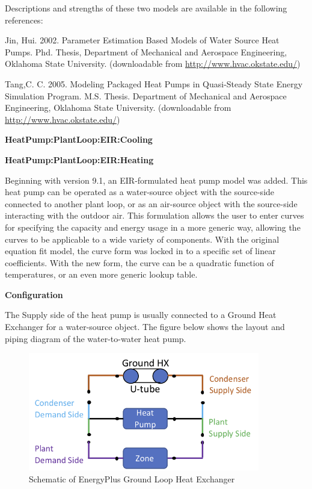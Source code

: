 Descriptions and strengths of these two models are available in the following references:

Jin, Hui. 2002. Parameter Estimation Based Models of Water Source Heat Pumps. Phd. Thesis, Department of Mechanical and Aerospace Engineering, Oklahoma State University. (downloadable from \href{http://www.hvac.okstate.edu}{http://www.hvac.okstate.edu/})

Tang,C. C. 2005. Modeling Packaged Heat Pumps in Quasi-Steady State Energy Simulation Program. M.S. Thesis. Department of Mechanical and Aerospace Engineering, Oklahoma State University. (downloadable from \href{http://www.hvac.okstate.edu}{http://www.hvac.okstate.edu/})

\textbf{HeatPump:PlantLoop:EIR:Cooling}

\textbf{HeatPump:PlantLoop:EIR:Heating}

Beginning with version 9.1, an EIR-formulated heat pump model was added. This heat pump can be operated as a water-source object with the source-side connected to another plant loop, or as an air-source object with the source-side interacting with the outdoor air.  This formulation allows the user to enter curves for specifying the capacity and energy usage in a more generic way, allowing the curves to be applicable to a wide variety of components.  With the original equation fit model, the curve form was locked in to a specific set of linear coefficients.  With the new form, the curve can be a quadratic function of temperatures, or an even more generic lookup table.

\textbf{Configuration}

The Supply side of the heat pump is usually connected to a Ground Heat Exchanger for a water-source object. The figure below shows the layout and piping diagram of the water-to-water heat pump.

\begin{figure}[hbtp] %
\centering
\includegraphics[width=0.9\textwidth, height=0.9\textheight, keepaspectratio=true]{media/image184.png}
\caption{Schematic of EnergyPlus Ground Loop Heat Exchanger \protect \label{fig:schematic-of-energyplus-ground-loop-heat-001}}
\end{figure}

